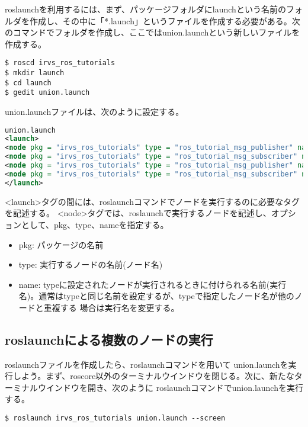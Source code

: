  roslaunchを利用するには、まず、パッケージフォルダにlaunchという名前のフォルダを作成し、その中に「*.launch」というファイルを作成する必要がある。次のコマンドでフォルダを作成し、ここではunion.launchという新しいファイルを作成する。

\begin{lstlisting}[language=ROS]
$ roscd irvs_ros_tutorials
$ mkdir launch
$ cd launch
$ gedit union.launch
\end{lstlisting}

union.launchファイルは、次のように設定する。

\begin{lstlisting}[language=XML]
union.launch
<launch>
<node pkg = "irvs_ros_tutorials" type = "ros_tutorial_msg_publisher" name = "msg_publisher1" />
<node pkg = "irvs_ros_tutorials" type = "ros_tutorial_msg_subscriber" name = "msg_subscriber1" />
<node pkg = "irvs_ros_tutorials" type = "ros_tutorial_msg_publisher" name = "msg_publisher2" />
<node pkg = "irvs_ros_tutorials" type = "ros_tutorial_msg_subscriber" name = "msg_subscriber2" />
</launch>
\end{lstlisting}

<launch>タグの間には、roslaunchコマンドでノードを実行するのに必要なタグを記述する。 <node>タグでは、roslaunchで実行するノードを記述し、オプションとして、pkg、type、nameを指定する。

\begin{itemize}
\item  pkg: パッケージの名前
\item type: 実行するノードの名前(ノード名)
\item name:  typeに設定されたノードが実行されるときに付けられる名前(実行名)。通常はtypeと同じ名前を設定するが、typeで指定したノード名が他のノードと重複する  場合は実行名を変更する。
\end{itemize}

\subsection{roslaunchによる複数のノードの実行}

roslaunchファイルを作成したら、roslaunchコマンドを用いて  union.launchを実行しよう。まず、roscore以外のターミナルウインドウを閉じる。次に、新たなターミナルウインドウを開き、次のように  roslaunchコマンドでunion.launchを実行する。

\begin{lstlisting}[language=ROS]
$ roslaunch irvs_ros_tutorials union.launch --screen
\end{lstlisting}

